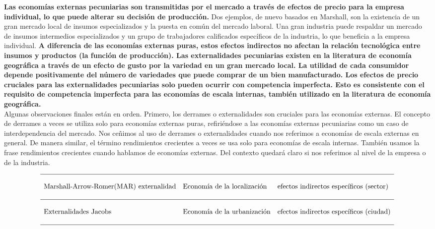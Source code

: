 \textbf{Las economías externas pecuniarias son transmitidas por el mercado a través de efectos de precio para la empresa individual, lo que puede alterar su decisión de producción.} Dos ejemplos, de nuevo basados en Marshall, son la existencia de un gran mercado local de insumos especializados y la puesta en común del mercado laboral. Una gran industria puede respaldar un mercado de insumos intermedios especializados y un grupo de trabajadores calificados específicos de la industria, lo que beneficia a la empresa individual. \textbf{A diferencia de las economías externas puras, estos efectos indirectos no afectan la relación tecnológica entre insumos y productos (la función de producción). Las externalidades pecuniarias existen en la literatura de economía geográfica a través de un efecto de gusto por la variedad en un gran mercado local. La utilidad de cada consumidor depende positivamente del número de variedades que puede comprar de un bien manufacturado. Los efectos de precio cruciales para las externalidades pecuniarias solo pueden ocurrir con competencia imperfecta. Esto es consistente con el requisito de competencia imperfecta para las economías de escala internas, también utilizado en la literatura de economía geográfica.}\\
Algunas observaciones finales están en orden. Primero, los derrames o externalidades son cruciales para las economías externas. El concepto de derrames a veces se utiliza solo para economías externas puras, refiriéndose a las economías externas pecuniarias como un caso de interdependencia del mercado. Nos ceñimos al uso de derrames o externalidades cuando nos referimos a economías de escala externas en general. De manera similar, el término rendimientos crecientes a veces se usa solo para economías de escala internas. También usamos la frase rendimientos crecientes cuando hablamos de economías externas. Del contexto quedará claro si nos referimos al nivel de la empresa o de la industria.

$$\begin{array}{lll}
    \hline\\
    \mbox{Marshall-Arrow-Romer(MAR) externalidad} & \mbox{Economía de la localización} & \mbox{efectos indirectos específicos (sector)}\\\\
    \hline\\
    \mbox{Externalidades Jacobs}&\mbox{Economía de la urbanización}&\mbox{efectos indirectos específicos (ciudad)}\\\\
    \hline\\
\end{array}$$

